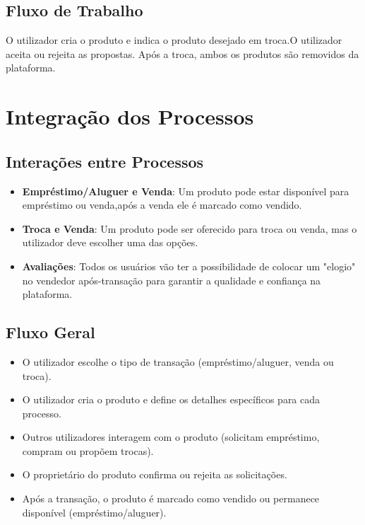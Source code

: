 \documentclass[a4paper, 12pt]{article} %
\begin{document}
\subsection{Fluxo de Trabalho}
O utilizador cria o produto e indica o produto desejado em troca.O utilizador aceita ou rejeita as propostas. Após a troca, ambos os produtos são removidos da plataforma.

\section{Integração dos Processos}

\subsection{Interações entre Processos}
\begin{itemize}
    \item \textbf{Empréstimo/Aluguer e Venda}: Um produto pode estar disponível para empréstimo ou venda,após a venda ele é marcado como vendido.
    \item \textbf{Troca e Venda}: Um produto pode ser oferecido para troca ou venda, mas o utilizador deve escolher uma das opções.
    \item \textbf{Avaliações}: Todos os usuários vão ter a possibilidade de colocar um "elogio" no vendedor após-transação para garantir a qualidade e confiança na plataforma. 
\end{itemize}

\subsection{Fluxo Geral}
\begin{itemize}
    \item O utilizador escolhe o tipo de transação (empréstimo/aluguer, venda ou troca).
    \item O utilizador cria o produto e define os detalhes específicos para cada processo.
    \item Outros utilizadores interagem com o produto (solicitam empréstimo, compram ou propõem trocas).
    \item O proprietário do produto confirma ou rejeita as solicitações.
    \item Após a transação, o produto é marcado como vendido ou permanece disponível (empréstimo/aluguer).
\end{itemize}

\newpage
\end{document}
